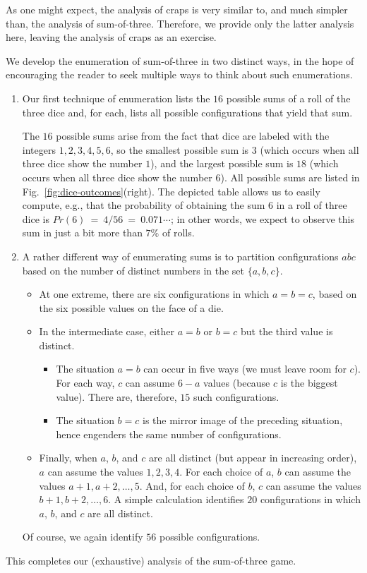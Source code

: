 \medskip

As one might expect, the analysis of craps is very similar to, and much simpler than, the analysis of sum-of-three.  Therefore, we provide only the latter analysis here, leaving the analysis of craps as an exercise.

\medskip

We develop the enumeration of sum-of-three in two distinct ways, in the hope of encouraging the reader to seek multiple ways to think about such enumerations.
\begin{enumerate}
\item 
Our first technique of enumeration lists the $16$ possible sums of a roll of the three  dice and, for each, lists all possible configurations that yield that sum.

\smallskip

The $16$ possible sums arise from the fact that dice are labeled with the integers $1, 2, 3, 4, 5, 6$, so the smallest possible sum is $3$ (which occurs when all three dice show the number $1$), and the largest possible sum is $18$ (which occurs when all three dice show the number $6$).  All possible sums are listed in Fig.~\ref{fig:dice-outcomes}(right).  The depicted table allows us to easily compute, e.g., that the probability of obtaining the sum $6$ in a roll of three dice is $Pr(6) \ = \ 4/56 \ = \ 0.071\cdots$; in other words, we expect to observe this sum in just a bit more than $7\%$ of rolls.

\medskip\item 
A rather different way of enumerating sums is to partition configurations $abc$ based on the number of distinct numbers in the set $\{ a, b, c\}$.
\begin{itemize}
\item
At one extreme, there are six configurations in which $a = b = c$, based on the six possible values on the face of a die.
\medskip\item
In the intermediate case, either $a=b$ or $b=c$ but the third value is distinct.
  \begin{itemize}
  \item
The situation $a=b$ can occur in five ways (we must leave room for $c$).  For each way, $c$ can assume $6-a$ values (because $c$ is the biggest value).  There are, therefore, $15$ such configurations.
  \medskip\item
The situation $b=c$ is the mirror image of the preceding situation, hence engenders the same number of configurations.
  \end{itemize}

\medskip\item
Finally, when $a$, $b$, and $c$ are all distinct (but appear in increasing order), $a$ can assume the values $1, 2, 3, 4$.  For each choice of $a$, $b$ can assume the values $a+1, a+2, \ldots, 5$.  And, for each choice of $b$, $c$ can assume the values $b+1, b+2, \ldots, 6$.  A simple calculation identifies $20$ configurations in which $a$, $b$, and $c$ are all distinct.
\end{itemize}
Of course, we again identify $56$ possible configurations.
\end{enumerate}
This completes our (exhaustive) analysis of the sum-of-three game.

